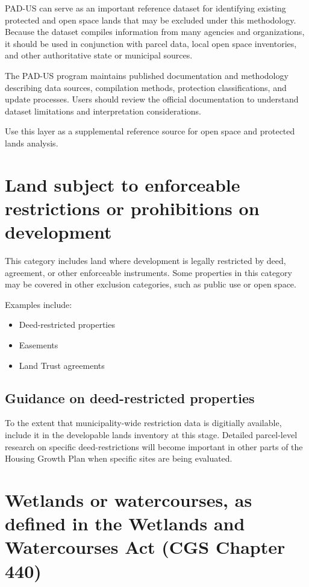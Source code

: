 \documentclass[
  letterpaper,
  DIV=11,
  numbers=noendperiod]{scrreprt}
\providecommand{\tightlist}{%
  \setlength{\itemsep}{0pt}\setlength{\parskip}{0pt}}
\begin{document}
PAD-US can serve as an important reference dataset for identifying
existing protected and open space lands that may be excluded under this
methodology. Because the dataset compiles information from many agencies
and organizations, it should be used in conjunction with parcel data,
local open space inventories, and other authoritative state or municipal
sources.

The PAD-US program maintains published documentation and methodology
describing data sources, compilation methods, protection
classifications, and update processes. Users should review the official
documentation to understand dataset limitations and interpretation
considerations.

Use this layer as a supplemental reference source for open space and
protected lands analysis.

\section{Land subject to enforceable restrictions or prohibitions on
development}\label{land-subject-to-enforceable-restrictions-or-prohibitions-on-development}

This category includes land where development is legally restricted by
deed, agreement, or other enforceable instruments. Some properties in
this category may be covered in other exclusion categories, such as
public use or open space.

Examples include:

\begin{itemize}
\tightlist
\item
  Deed-restricted properties
\item
  Easements
\item
  Land Trust agreements
\end{itemize}

\subsection{Guidance on deed-restricted
properties}\label{guidance-on-deed-restricted-properties}

To the extent that municipality-wide restriction data is digitially
available, include it in the developable lands inventory at this stage.
Detailed parcel-level research on specific deed-restrictions will become
important in other parts of the Housing Growth Plan when specific sites
are being evaluated.

\section{Wetlands or watercourses, as defined in the Wetlands and
Watercourses Act (CGS Chapter
440)}\label{wetlands-or-watercourses-as-defined-in-the-wetlands-and-watercourses-act-cgs-chapter-440}
\end{document}
